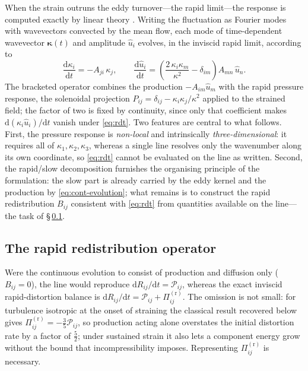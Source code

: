\documentclass[lineno]{JFM-FLM_Au}
\begin{document}
When the strain outruns the eddy turnover---the rapid limit---the
response is computed exactly by linear theory
\citep{BatchelorProudman1954,Hunt1973,HuntCarruthers1990}. Writing the
fluctuation as Fourier modes with wavevectors convected by the mean
flow, each mode of time-dependent wavevector $\boldsymbol{\kappa}(t)$ and amplitude
$\hat{u}_i$ evolves, in the inviscid rapid limit, according to
\begin{equation}
  \frac{\mathrm{d}\kappa_i}{\mathrm{d}t}=-A_{ji}\,\kappa_j,
  \qquad
  \frac{\mathrm{d}\hat{u}_i}{\mathrm{d}t}
  =\left(\frac{2\,\kappa_i \kappa_m}{\kappa^2}-\delta_{im}\right)
   A_{mn}\,\hat{u}_n .
  \label{eq:rdt}
\end{equation}
The bracketed operator combines the production $-A_{im}\hat u_m$ with the
rapid pressure response, the solenoidal projection
$P_{ij}=\delta_{ij}-\kappa_i\kappa_j/\kappa^2$ applied to the strained
field; the factor of two is fixed by continuity, since only that
coefficient makes $\mathrm{d}(\kappa_i\hat u_i)/\mathrm{d}t$ vanish under
\eqref{eq:rdt}. Two features are central to what follows. First, the
pressure response is \emph{non-local} and intrinsically
\emph{three-dimensional}: it requires all of
$\kappa_1,\kappa_2,\kappa_3$, whereas a single line resolves only the
wavenumber along its own coordinate, so \eqref{eq:rdt} cannot be
evaluated on the line as written. Second, the rapid/slow decomposition
furnishes the organising principle of the formulation: the slow part is
already carried by the eddy kernel and the production by
\eqref{eq:cont-evolution}; what remains is to construct the rapid
redistribution $B_{ij}$ consistent with \eqref{eq:rdt} from quantities
available on the line---the task of \S\,\ref{sec:rapid-kernel}.

\subsection{The rapid redistribution operator}\label{sec:rapid-kernel}

Were the continuous evolution to consist of production and diffusion only
($B_{ij}=0$), the line would reproduce
$\mathrm{d}R_{ij}/\mathrm{d}t=\mathcal{P}_{ij}$, whereas the exact
inviscid rapid-distortion balance is
$\mathrm{d}R_{ij}/\mathrm{d}t=\mathcal{P}_{ij}+\Pi^{(\mathrm r)}_{ij}$.
The omission is not small: for turbulence isotropic at the onset of
straining the classical result recovered below gives
$\Pi^{(\mathrm r)}_{ij}=-\tfrac35\mathcal{P}_{ij}$, so production acting
alone overstates the initial distortion rate by a factor of $\tfrac52$;
under sustained strain it also lets a component energy grow without the
bound that incompressibility imposes. Representing
$\Pi^{(\mathrm r)}_{ij}$ is necessary.
\end{document}
